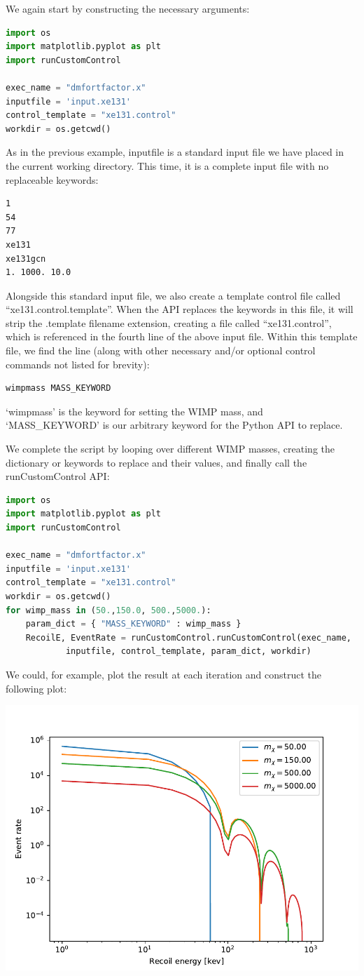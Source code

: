 \documentclass[11pt]{article}
\begin{document}
We again start by constructing the necessary arguments:
\begin{lstlisting}[language=python]
import os
import matplotlib.pyplot as plt
import runCustomControl

exec_name = "dmfortfactor.x"
inputfile = 'input.xe131'
control_template = "xe131.control"
workdir = os.getcwd()
\end{lstlisting}
As in the previous example, inputfile is a standard input file we have placed in
the current working directory. This time, it is a complete input file with no
replaceable keywords:
\begin{verbatim}
1
54
77
xe131
xe131gcn
1. 1000. 10.0
\end{verbatim}
Alongside this standard input file, we also create a template control file
called ``xe131.control.template''. When the API replaces the keywords in this
file, it will strip the .template filename extension, creating a file called
``xe131.control'', which is referenced in the fourth line of the above input
file. Within this template file, we find the line (along with other necessary
and/or optional control commands not listed for brevity):
\begin{verbatim}
wimpmass MASS_KEYWORD
\end{verbatim}
`wimpmass' is the keyword for setting the WIMP mass, and `MASS\_KEYWORD' is our
arbitrary keyword for the Python API to replace.

We complete the script by looping over different WIMP masses, creating the
dictionary or keywords to replace and their values, and finally call the
runCustomControl API:
\begin{lstlisting}[language=python]
import os
import matplotlib.pyplot as plt
import runCustomControl

exec_name = "dmfortfactor.x"
inputfile = 'input.xe131'
control_template = "xe131.control"
workdir = os.getcwd()
for wimp_mass in (50.,150.0, 500.,5000.):
    param_dict = { "MASS_KEYWORD" : wimp_mass }
    RecoilE, EventRate = runCustomControl.runCustomControl(exec_name,
            inputfile, control_template, param_dict, workdir)
\end{lstlisting}
We could, for example, plot the result at each iteration and construct the
following plot:

\includegraphics[width=.8 \textwidth]{xe131.WIMPmassCompare.pdf}
\end{document}
